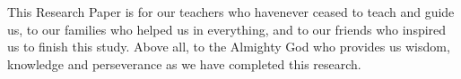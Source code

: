 \thispagestyle{empty}

\vfill
\begin{center}
\singlespacing
This Research Paper is for our teachers who havenever ceased to teach and guide us, 
to our families who helped us in everything, and to our friends who inspired us  to 
finish this study. Above all, to the Almighty God who provides us wisdom, knowledge 
and perseverance as we have completed this research.
\end{center}
\vfill
\clearpage
\newpage